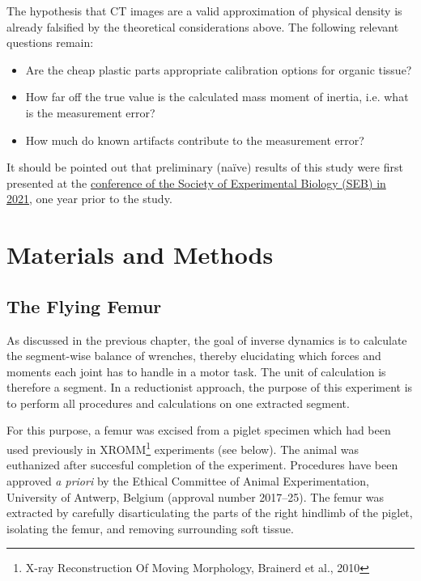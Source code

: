 The hypothesis that CT images are a valid approximation of physical density is already falsified by the theoretical considerations above.
The following relevant questions remain:
\begin{itemize}
\item Are the cheap plastic parts appropriate calibration options for organic tissue?
\item How far off the true value is the calculated mass moment of inertia, i.e. what is the measurement error?
\item How much do known artifacts contribute to the measurement error?
\end{itemize}


It should be pointed out that preliminary (naïve) results of this study were first presented at the \href{http://mielke-bio.info/falk/posts/26.seb2021}{conference of the Society of Experimental Biology (SEB) in 2021}, one year prior to the \citet{Durston2022} study.




\section{Materials and Methods}
\label{sec:org1185d71}
\subsection{The Flying Femur}
\label{sec:org45b0e81}

As discussed in the previous chapter, the goal of inverse dynamics is to calculate the segment-wise balance of wrenches, thereby elucidating which forces and moments each joint has to handle in a motor task.
The unit of calculation is therefore a segment.
In a reductionist approach, the purpose of this experiment is to perform all procedures and calculations on one extracted segment.

For this purpose, a femur was excised from a piglet specimen which had been used previously in XROMM\footnote{X-ray Reconstruction Of Moving Morphology, Brainerd et al., 2010} experiments (see below). \nocite{Brainerd2010}
The animal was euthanized after succesful completion of the experiment.
Procedures have been approved \emph{a priori} by the Ethical Committee of Animal Experimentation, University of Antwerp, Belgium (approval number 2017–25).
The femur was extracted by carefully disarticulating the parts of the right hindlimb of the piglet, isolating the femur, and removing surrounding soft tissue.

